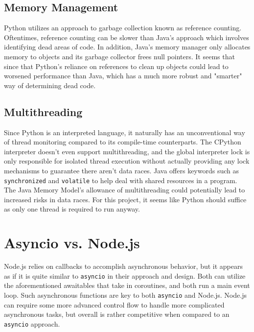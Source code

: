\subsection{Memory Management}

Python utilizes an approach to garbage collection known as reference counting. Oftentimes, reference counting can be slower than Java's approach which involves identifying dead areas of code. In addition, Java's memory manager only allocates memory to objects and its garbage collector frees null pointers. It seems that since that Python's reliance on references to clean up objects could lead to worsened performance than Java, which has a much more robust and "smarter" way of determining dead code. 


\subsection{Multithreading}

Since Python is an interpreted language, it naturally has an unconventional way of thread monitoring compared to its compile-time counterparts. The CPython interpreter doesn't even support multithreading, and the global interpreter lock is only responsible for isolated thread execution without actually providing any lock mechanisms to guarantee there aren't data races. Java offers keywords such as \verb +synchronized+ and \verb +volatile+ to help deal with shared resources in a program. The Java Memory Model's allowance of multithreading could potentially lead to increased risks in data races. For this project, it seems like Python should suffice as only one thread is required to run anyway. 



\section{Asyncio vs. Node.js}

Node.js relies on callbacks to accomplish asynchronous behavior, but it appears as if it is quite similar to \verb +asyncio+ in their approach and design. Both can utilize the aforementioned awaitables that take in coroutines, and both run a main event loop. Such asynchronous functions are key to both  \verb +asyncio+ and Node.js. Node.js can require some more advanced control flow to handle more complicated asynchronous tasks, but overall is rather competitive when compared to an  \verb +asyncio+ approach. 




